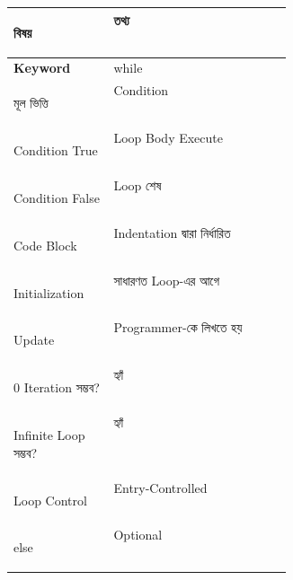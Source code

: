 

\begin{tabularx}
{\linewidth}
{
|>{\bfseries\RaggedRight\arraybackslash}p{0.36\linewidth}
|Y|
}

\hline
{}

\textbf{বিষয়}
&
\textbf{তথ্য}
\\
\hline

Keyword
&
\textenglish{\ttfamily while}
\\
\hline

মূল ভিত্তি
&
Condition
\\
\hline

Condition True
&
Loop Body Execute
\\
\hline

Condition False
&
Loop শেষ
\\
\hline

Code Block
&
Indentation দ্বারা নির্ধারিত
\\
\hline

Initialization
&
সাধারণত Loop-এর আগে
\\
\hline

Update
&
Programmer-কে লিখতে হয়
\\
\hline

0 Iteration সম্ভব?
&
হ্যাঁ
\\
\hline

Infinite Loop সম্ভব?
&
হ্যাঁ
\\
\hline

Loop Control
&
Entry-Controlled
\\
\hline

\textenglish{\ttfamily else}
&
Optional
\\
\hline

\end{tabularx}



